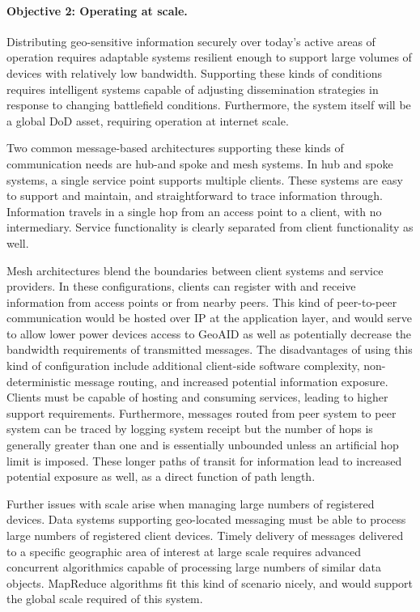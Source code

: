 \documentclass{sbir}
\begin{document}
\paragraph{Objective 2: Operating at scale.} Distributing geo-sensitive information securely over today's active areas of operation requires adaptable systems resilient enough to support large volumes of devices with relatively low bandwidth.  Supporting these kinds of conditions requires intelligent systems capable of adjusting dissemination strategies in response to changing battlefield conditions.  Furthermore, the system itself will be a global DoD asset, requiring operation at internet scale.

Two common message-based architectures supporting these kinds of communication needs are hub-and spoke and mesh systems.  In hub and spoke systems, a single service point supports multiple clients.  These systems are easy to support and maintain, and straightforward to trace information through.  Information travels in a single hop from an access point to a client, with no intermediary.  Service functionality is clearly separated from client functionality as well.

Mesh architectures blend the boundaries between client systems and service providers.  In these configurations, clients can register with and receive information from access points or from nearby peers.  This kind of peer-to-peer communication would be hosted over IP at the application layer, and would serve to allow lower power devices access to GeoAID as well as potentially decrease the bandwidth requirements of transmitted messages.  The disadvantages of using this kind of configuration include additional client-side software complexity, non-deterministic message routing, and increased potential information exposure.  Clients must be capable of hosting and consuming services, leading to higher support requirements.  Furthermore, messages routed from peer system to peer system can be traced by logging system receipt but the number of hops is generally greater than one and is essentially unbounded unless an artificial hop limit is imposed.  These longer paths of transit for information lead to increased potential exposure as well, as a direct function of path length.

Further issues with scale arise when managing large numbers of registered devices.  Data systems supporting geo-located messaging must be able to process large numbers of registered client devices.  Timely delivery of messages delivered to a specific geographic area of interest at large scale requires advanced concurrent algorithmics capable of processing large numbers of similar data objects.  MapReduce algorithms fit this kind of scenario nicely, and would support the global scale required of this system.
\end{document}
